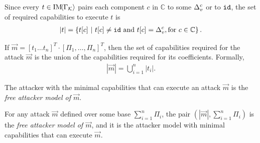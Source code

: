 {\begin{corollary}
\label{cor:CPSRobustness:Capabilities}
Since every $t\in \text{IM}\!{{\left<\Gamma_{\mathcal{K}}\right>}}$ pairs each component $c$ in $\mathbb{C}$ to some ${\Delta}^{c}_{v}$ or to ${\texttt{id}}$, 
the set of required capabilities to execute $t$ is 
\begin{align}
  |t|=\left\{t[c]\ |\ t[c]\neq {\texttt{id}} \text{ and } t[c]={\Delta}^{c}_{v}, \text{for $c\in \mathbb{C}$}\right\}.
\end{align}
\end{corollary}
\begin{corollary}
  \label{cor:CPSRobustness:GeneralCapabilities}
If $\vec{m}=[t_1\ldots t_n]^T\cdot[\Pi_1, \ldots, \Pi_n]^T$, then the set of capabilities required for the attack $\vec{m}$ is the union of the capabilities required for its coefficients. Formally, 
\begin{align}
  |\vec{m}|=\bigcup_{i=1}^n|t_i|.
\end{align}
\end{corollary}
The attacker with the minimal capabilities that can execute an attack $\vec{m}$ is the \emph{free attacker model of $\vec{m}$}.
\begin{definition}
 For any attack $\vec{m}$ defined over some base $\sum_{i=1}^n\Pi_i$, the pair $(|\vec{m}|, \sum_{i=1}^n\Pi_i)$ is the \emph{free attacker model of $\vec{m}$}, and it is the attacker model with minimal capabilities that can execute $\vec{m}$.
  \end{definition}

}
